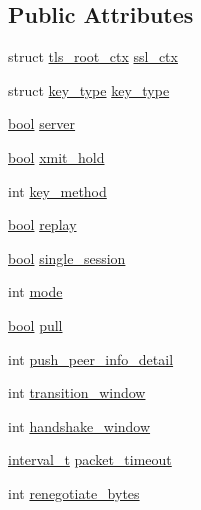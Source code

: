 \subsection*{Public Attributes}
\begin{DoxyCompactItemize}
\item 
struct \hyperlink{structtls__root__ctx}{tls\+\_\+root\+\_\+ctx} \hyperlink{structtls__options_aba252683ca7cc18c66e8f30762f61ac0}{ssl\+\_\+ctx}
\item 
struct \hyperlink{structkey__type}{key\+\_\+type} \hyperlink{structtls__options_accfc424cfd53ef0905546cffc6e462ce}{key\+\_\+type}
\item 
\hyperlink{automatic_8c_abb452686968e48b67397da5f97445f5b}{bool} \hyperlink{structtls__options_a304fb76d1a8c5c3f12f94d66baa51f06}{server}
\item 
\hyperlink{automatic_8c_abb452686968e48b67397da5f97445f5b}{bool} \hyperlink{structtls__options_ac267c87257baba5792b12cb984761ded}{xmit\+\_\+hold}
\item 
int \hyperlink{structtls__options_a3d6203ba03626f5d17edcad17f3dc9a2}{key\+\_\+method}
\item 
\hyperlink{automatic_8c_abb452686968e48b67397da5f97445f5b}{bool} \hyperlink{structtls__options_a85250d11ac83ee6a0877ba7a6d193b61}{replay}
\item 
\hyperlink{automatic_8c_abb452686968e48b67397da5f97445f5b}{bool} \hyperlink{structtls__options_aa165f8c2301d2dc25b72ef200020ccb5}{single\+\_\+session}
\item 
int \hyperlink{structtls__options_a077d6739e499c8488515daf582da6021}{mode}
\item 
\hyperlink{automatic_8c_abb452686968e48b67397da5f97445f5b}{bool} \hyperlink{structtls__options_add28a119d5a28d79dd0d45e6e0df3ab2}{pull}
\item 
int \hyperlink{structtls__options_ad0558f94c9b567224214fdee59844be6}{push\+\_\+peer\+\_\+info\+\_\+detail}
\item 
int \hyperlink{structtls__options_a8679088462548aabda1f3921460e3cfe}{transition\+\_\+window}
\item 
int \hyperlink{structtls__options_ae0e1be267ee100554d22b027d96191db}{handshake\+\_\+window}
\item 
\hyperlink{common_8h_a3d8621f960ada51a5ad9ff181730481a}{interval\+\_\+t} \hyperlink{structtls__options_a3cdc00d65d70c350182145ce7f183fcd}{packet\+\_\+timeout}
\item 
int \hyperlink{structtls__options_ae9ff132a3c7d846e0609b807c86d064a}{renegotiate\+\_\+bytes}

\end{DoxyCompactItemize}
